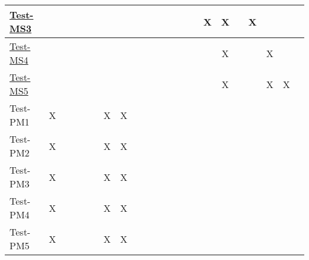 \documentclass[12pt, titlepage]{article}
\begin{document}
\begin{landscape}
\begin{table}[H]
\begin{adjustwidth}{-0.1in}{-1in}
{\begin{tabular}{|c|c|c|c|c|c|c|c|c|c|c|c|c|c|c|c|c|c|c|c|c|c|}
\multicolumn{1}{|l|}{\hyperref[itm:Test-MS3]{Test-MS3}}   &             &              &             &             &             &             &              &              &             &             &              &             &              &                &X &X & &X & & &\\ \hline
\multicolumn{1}{|l|}{\hyperref[itm:Test-MS4]{Test-MS4}}    &             &              &             &             &             &             &              &              &             &             &              &             &              &                & &X & & &X & &\\ \hline
\multicolumn{1}{|l|}{\hyperref[itm:Test-MS5]{Test-MS5}}  &             &              &             &             &             &             &              &              &             &             &              &             &              &                & &X & & &X &X &\\ \hline
\multicolumn{1}{|l|}{{Test-PM1}}   &    X         &              &             &            &             &    X         &        X     &             &              &              &             &             &              &             &              &                & & & & &\\ \hline
\multicolumn{1}{|l|}{{Test-PM2}}   &    X         &              &             &            &             &    X         &        X     &             &              &              &             &             &              &             &              &                & & & & &\\ \hline
\multicolumn{1}{|l|}{{Test-PM3}}   &    X         &              &             &            &             &    X         &        X     &             &              &              &             &             &              &             &              &                & & & & &\\ \hline
\multicolumn{1}{|l|}{{Test-PM4}}   &    X         &              &             &            &             &    X         &        X     &             &              &              &             &             &              &             &              &                & & & & &\\ \hline
\multicolumn{1}{|l|}{{Test-PM5}}   &    X         &              &             &            &             &    X         &        X     &             &              &              &             &             &              &             &              &                & & & & &\\ \hline

\end{tabular}}
\end{adjustwidth}
\end{table}
\end{landscape}
\end{document}
